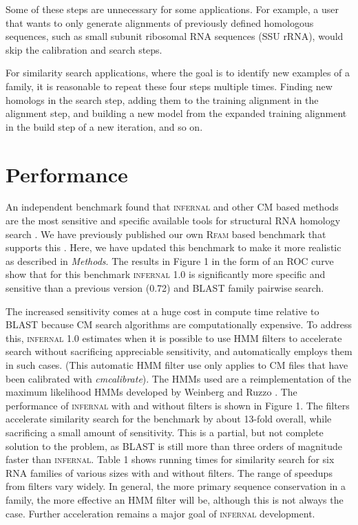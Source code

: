 \documentclass[11pt]{article}
\begin{document}
Some of these steps are unnecessary for some applications. For
example, a user that wants to only generate alignments of previously
defined homologous sequences, such as small subunit ribosomal RNA
sequences (SSU rRNA), would skip the calibration and search steps. 

For similarity search applications, where the goal is to identify new
examples of a family, it is reasonable to repeat these four steps
multiple times.  Finding new homologs in the search step, adding them
to the training alignment in the alignment step, and building a new
model from the expanded training alignment in the build step of a new
iteration, and so on.

\section{Performance}
An independent benchmark found that \textsc{infernal} and other CM
based methods are the most sensitive and specific available tools for
structural RNA homology search \cite{Freyhult07}.  We have previously
published our own \textsc{Rfam} based benchmark that supports this
\cite{NawrockiEddy07}. Here, we have updated this benchmark to make it
more realistic as described in \emph{Methods}. The results in Figure 1
in the form of an ROC curve show that for this benchmark
\textsc{infernal} 1.0 is significantly more specific and sensitive
than a previous version (0.72) and \textsc{BLAST} family pairwise
search.  

The increased sensitivity comes at a huge cost in compute time
relative to \textsc{BLAST} because CM search algorithms are
computationally expensive. To address this, \textsc{infernal} 1.0
estimates when it is possible to use HMM filters to accelerate search
without sacrificing appreciable sensitivity, and automatically employs
them in such cases. (This automatic HMM filter use only applies to CM
files that have been calibrated with \emph{cmcalibrate}).  The HMMs
used are a reimplementation of the maximum likelihood HMMs developed
by Weinberg and Ruzzo \cite{WeinbergRuzzo06}.  The performance of
\textsc{infernal} with and without filters is shown in Figure 1. The
filters accelerate similarity search for the benchmark by about
13-fold overall, while sacrificing a small amount of sensitivity.
This is a partial, but not complete solution to the problem, as
\textsc{BLAST} is still more than three orders of magnitude faster
than \textsc{infernal}. Table 1 shows running times for similarity
search for six RNA families of various sizes with and without
filters. The range of speedups from filters vary widely. In general,
the more primary sequence conservation in a family, the more effective
an HMM filter will be, although this is not always the case. Further
acceleration remains a major goal of \textsc{infernal} development.
\end{document}
